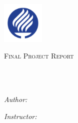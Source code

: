 \documentclass[
11pt, 
oneside,
english,
onehalfspacing,
onehalfspacing,
parskip,
headsepline,
chapterinoneline,
]{MastersDoctoralThesis}
\author{Antonio Osamu \textsc{Katagiri} Tanaka}
\begin{document}
\frontmatter

\pagestyle{plain} 


\begin{titlepage}
\begin{center}

\vspace*{.06\textheight}
{\scshape\LARGE \univname\par} %

\includegraphics[width=0.15\textwidth]{./Figures/uniLogo.png}

\vspace{0.5cm}
\textsc{\Large Final Project Report}\\[0.5cm]      %

\HRule \\%
{\huge \bfseries \ttitle\par}\vspace{0.0cm} %
\HRule \\[0.5cm]                            %
 
\begin{minipage}[t]{0.4\textwidth}
\begin{flushleft} \large
\emph{Author:}\\

\href{https://linkedin.com/in/osamu-katagiri-84b2b940/}{\authorname}

\end{flushleft}
\end{minipage}

\begin{minipage}[t]{0.4\textwidth}
\begin{flushright} \large
\emph{Instructor:} \\
\supname


\end{flushright}
\end{minipage}
\end{center}
\end{titlepage}
\end{document}
